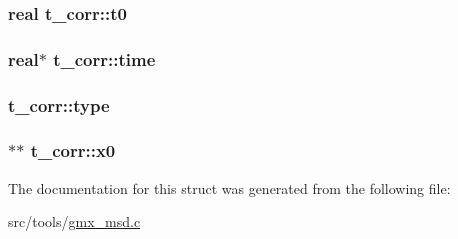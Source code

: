 \hypertarget{structt__corr_a47fc3261613b2ea06a74faf544334dfb}{
\subsubsection[{t0}]{\setlength{\rightskip}{0pt plus 5cm}real {\bf t\-\_\-corr\-::t0}}}\label{structt__corr_a47fc3261613b2ea06a74faf544334dfb}
\hypertarget{structt__corr_ab3d439164a49c8e3818cca0bcd3877bf}{
\subsubsection[{time}]{\setlength{\rightskip}{0pt plus 5cm}real$\ast$ {\bf t\-\_\-corr\-::time}}}\label{structt__corr_ab3d439164a49c8e3818cca0bcd3877bf}
\hypertarget{structt__corr_a0dbb7cd61eb8386ffcd43a4f71834f14}{
\subsubsection[{type}]{ {\bf t\-\_\-corr\-::type}}}\label{structt__corr_a0dbb7cd61eb8386ffcd43a4f71834f14}
\hypertarget{structt__corr_a39860b3edc3dd3acdc5f1be59bd33f08}{
\subsubsection[{x0}]{$\ast$$\ast$ {\bf t\-\_\-corr\-::x0}}}\label{structt__corr_a39860b3edc3dd3acdc5f1be59bd33f08}


\-The documentation for this struct was generated from the following file\-:\begin{DoxyCompactItemize}
\item 
src/tools/\hyperlink{gmx__msd_8c}{gmx\-\_\-msd.\-c}\end{DoxyCompactItemize}
